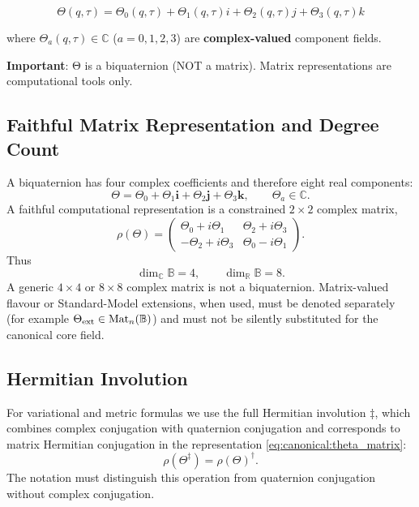 \begin{equation}
\label{eq:canonical:theta_explicit}
\Theta(q,\tau) = \Theta_0(q,\tau) + \Theta_1(q,\tau) i + \Theta_2(q,\tau) j + \Theta_3(q,\tau) k
\end{equation}

where $\Theta_a(q,\tau) \in \mathbb{C}$ ($a = 0,1,2,3$) are \textbf{complex-valued} component fields.

\textbf{Important}: Θ is a biquaternion (NOT a matrix). Matrix representations are computational tools only.

\subsection{Faithful Matrix Representation and Degree Count}

A biquaternion has four complex coefficients and therefore eight real
components:
\begin{equation}
  \Theta=\Theta_0+\Theta_1\mathbf i+\Theta_2\mathbf j+\Theta_3\mathbf k,
  \qquad \Theta_a\in\mathbb C.
\end{equation}
A faithful computational representation is a constrained $2\times2$ complex
matrix,
\begin{equation}
\label{eq:canonical:theta_matrix}
  \rho(\Theta)=
  \begin{pmatrix}
    \Theta_0+i\Theta_1 & \Theta_2+i\Theta_3\\
    -\Theta_2+i\Theta_3 & \Theta_0-i\Theta_1
  \end{pmatrix}.
\end{equation}
Thus
\begin{equation}
  \dim_{\mathbb C}\mathbb B=4,
  \qquad
  \dim_{\mathbb R}\mathbb B=8.
\end{equation}
A generic $4\times4$ or $8\times8$ complex matrix is not a biquaternion.
Matrix-valued flavour or Standard-Model extensions, when used, must be denoted
separately (for example $\Theta_{\rm ext}\in\operatorname{Mat}_n(\mathbb B)$)
and must not be silently substituted for the canonical core field.

\subsection{Hermitian Involution}

For variational and metric formulas we use the full Hermitian involution
$\ddagger$, which combines complex conjugation with quaternion conjugation and
corresponds to matrix Hermitian conjugation in the representation
\eqref{eq:canonical:theta_matrix}:
\begin{equation}
  \rho(\Theta^\ddagger)=\rho(\Theta)^\dagger.
\end{equation}
The notation must distinguish this operation from quaternion conjugation without
complex conjugation.

